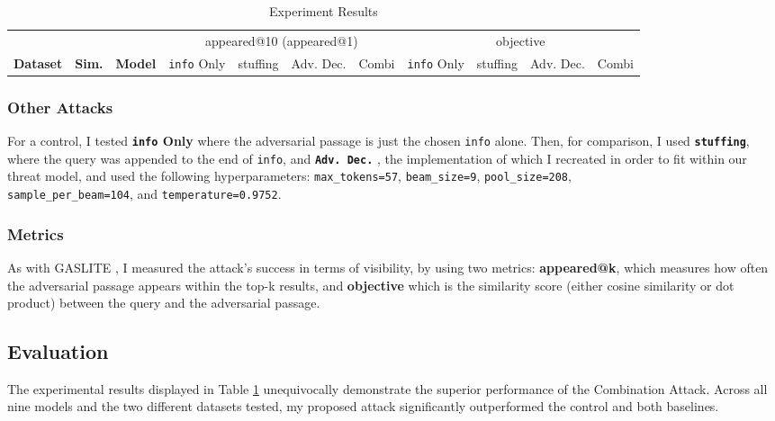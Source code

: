 \documentclass[a4paper, sigconf]{acmart}
\begin{document}
\begin{table}[h!]
\caption{Experiment Results}
\label{table:res}
\begin{tabular}{lll|cccc|cccc}
  \hline
   & & & \multicolumn{4}{c}{appeared@10 (appeared@1)} & \multicolumn{4}{c}{objective} \\
  \textbf{Dataset} & \textbf{Sim.} & \textbf{Model} & \texttt{info} Only & stuffing & Adv. Dec. & Combi & \texttt{info} Only & stuffing & Adv. Dec. & Combi \\
  \hline
 
 \end{tabular}
\end{table}


\subsubsection*{Other Attacks} For a control, I tested \textbf{\texttt{info} Only} where the adversarial passage is just the chosen \texttt{info} alone. Then, for comparison, I used \textbf{\texttt{stuffing}}, where the query was appended to the end of \texttt{info}, and \textbf{\texttt{Adv. Dec.}} \cite{zhang2025-adv}, the implementation of which I recreated in order to fit within our threat model, and used the following hyperparameters: \texttt{max\_tokens=57}, \texttt{beam\_size=9}, \texttt{pool\_size=208}, \\\texttt{sample\_per\_beam=104}, and \texttt{temperature=0.9752}.

\subsubsection*{Metrics} As with GASLITE \cite{bentov2024}, I measured the attack's success in terms of visibility, by using two metrics: \textbf{appeared@k}, which measures how often the adversarial passage appears within the top-k results, and \textbf{objective} which is the similarity score (either cosine similarity or dot product) between the query and the adversarial passage. 


\subsection{Evaluation}

The experimental results displayed in Table \ref{table:res} unequivocally demonstrate the superior performance of the Combination Attack. Across all nine models and the two different datasets tested, my proposed attack significantly outperformed the control and both baselines.
\end{document}
